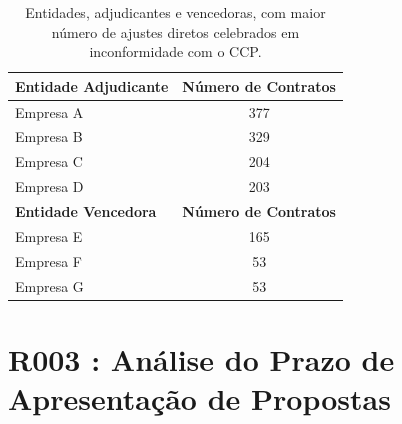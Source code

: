 \begin{table}[H]
	\centering
	\renewcommand{\arraystretch}{1.1}
	\setlength{\tabcolsep}{35pt}
		\begin{tabular}{lc}
			\hline
			\textbf{Entidade Adjudicante} & \multicolumn{1}{r}{\textbf{Número de Contratos}} \\ \hline
			Empresa A                     & 377                                              \\
			Empresa B                     & 329                                              \\
			Empresa C                     & 204                                              \\
			Empresa D                     & 203                                              \\ \hline
			\textbf{Entidade Vencedora}   & \textbf{Número de Contratos}                     \\ \hline
			Empresa E                     & 165                                              \\
			Empresa F                     & 53                                               \\
			Empresa G                     & 53                                              
		\end{tabular}%
	\caption{Entidades, adjudicantes e vencedoras, com maior número de ajustes diretos celebrados em inconformidade com o CCP.}
	\label{tab:rf1}
\end{table}


%
%
%



\section{R003 : Análise do Prazo de Apresentação de Propostas}

